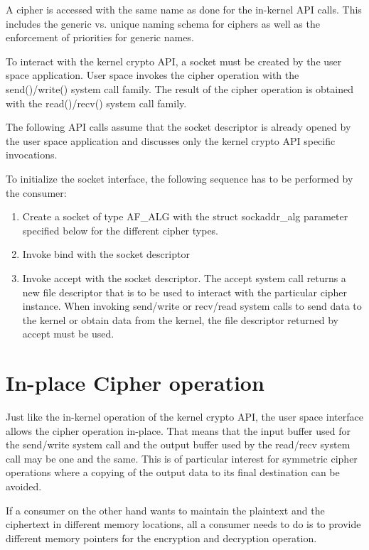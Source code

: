 \documentclass[a4paper,8pt,english]{sphinxmanual}
\begin{document}
A cipher is accessed with the same name as done for the in-kernel API
calls. This includes the generic vs. unique naming schema for ciphers as
well as the enforcement of priorities for generic names.

To interact with the kernel crypto API, a socket must be created by the
user space application. User space invokes the cipher operation with the
send()/write() system call family. The result of the cipher operation is
obtained with the read()/recv() system call family.

The following API calls assume that the socket descriptor is already
opened by the user space application and discusses only the kernel
crypto API specific invocations.

To initialize the socket interface, the following sequence has to be
performed by the consumer:
\begin{enumerate}
\item {} 
Create a socket of type AF\_ALG with the struct sockaddr\_alg
parameter specified below for the different cipher types.

\item {} 
Invoke bind with the socket descriptor

\item {} 
Invoke accept with the socket descriptor. The accept system call
returns a new file descriptor that is to be used to interact with the
particular cipher instance. When invoking send/write or recv/read
system calls to send data to the kernel or obtain data from the
kernel, the file descriptor returned by accept must be used.

\end{enumerate}


\section{In-place Cipher operation}
\label{crypto/userspace-if:in-place-cipher-operation}
Just like the in-kernel operation of the kernel crypto API, the user
space interface allows the cipher operation in-place. That means that
the input buffer used for the send/write system call and the output
buffer used by the read/recv system call may be one and the same. This
is of particular interest for symmetric cipher operations where a
copying of the output data to its final destination can be avoided.

If a consumer on the other hand wants to maintain the plaintext and the
ciphertext in different memory locations, all a consumer needs to do is
to provide different memory pointers for the encryption and decryption
operation.
\end{document}
